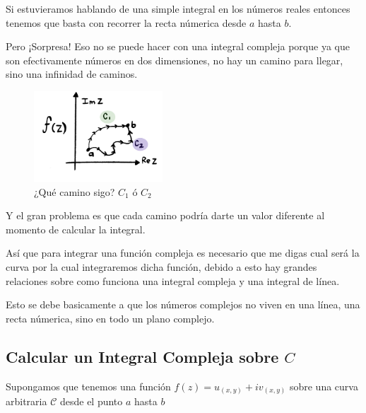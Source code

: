 \documentclass[12pt, fleqn]{report}                             %
\theoremstyle{break}                                            %
\begin{document}
            Si estuvieramos hablando de una simple integral en los números reales entonces
            tenemos que basta con recorrer la recta númerica desde $a$ hasta $b$.

            Pero ¡Sorpresa! Eso no se puede hacer con una integral compleja porque ya que son
            efectivamente números en dos dimensiones, no hay un camino para llegar, sino
            una infinidad de caminos.

            \begin{figure}
                \centering
                \includegraphics[width=0.43\textwidth]{CaminosDeIntegralCompleja.jpg}
                \caption{\scriptsize{¿Qué camino sigo? $C_1$ ó $C_2$}}
            \end{figure}

            Y el gran problema es que cada camino podría darte un valor diferente
            al momento de calcular la integral.

            Así que para integrar una función compleja es necesario que me digas
            cual será la curva por la cual integraremos dicha función, debido a esto
            hay grandes relaciones sobre como funciona una integral compleja y una 
            integral de línea.

            Esto se debe basicamente a que los números complejos no viven en una línea, 
            una recta númerica, sino en todo un plano complejo.


            \clearpage
            \subsection{Calcular un Integral Compleja sobre $C$}


                Supongamos que tenemos una función $f(z) = u_{(x,y)} + iv_{(x,y)}$
                sobre una curva arbitraria $\mathcal{C}$ desde el punto $a$ hasta $b$
\end{document}
